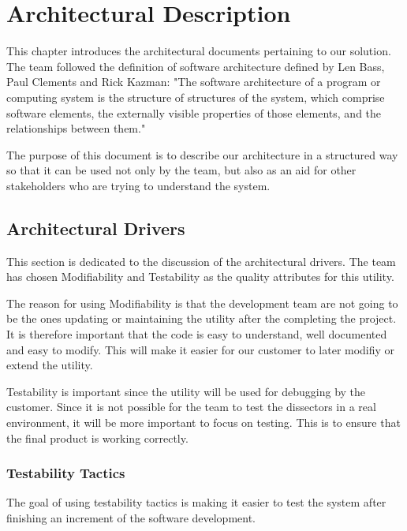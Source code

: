 \chapter{Architectural Description}
This chapter introduces the architectural documents pertaining to our solution. The team followed the definition of software architecture defined by Len Bass, Paul Clements and Rick Kazman: "The software architecture of a program or computing
system is the structure of structures of the system, which comprise software elements, the externally visible properties of those elements, and the relationships between them."\cite{Bass2003}

The purpose of this document is to describe our architecture in a structured way so that it can be used not only by the team, but also as an aid for other stakeholders who are trying to understand the system.


\section{Architectural Drivers}
This section is dedicated to the discussion of the architectural drivers.
The team has chosen Modifiability and Testability as the quality attributes for this utility. 

The reason for using Modifiability is that the development team are not going to be the ones updating or maintaining the utility after the completing the project. It is therefore important that the code is easy to understand, well documented and easy to modify. This will make it easier for our customer to later modifiy or extend the utility.

Testability is important since the utility will be used for debugging by the customer.  Since it is not possible for the team to test the dissectors in a real environment, it will be more important to focus on testing. This is to ensure that the final product is working correctly.

\subsection{Testability Tactics}
The goal of using testability tactics is making it easier to test the system after finishing an increment of the software development. 

